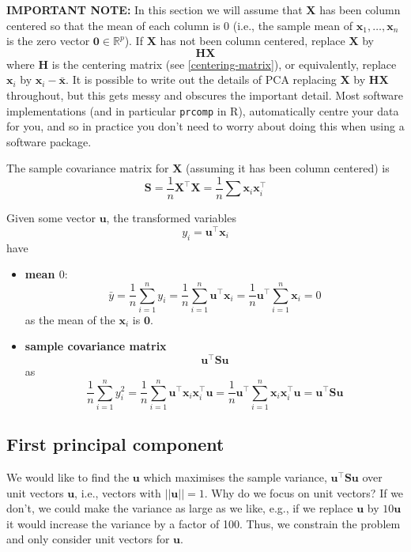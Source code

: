 \documentclass[]{book}
\theoremstyle{definition}
\theoremstyle{definition}
\theoremstyle{definition}
\theoremstyle{remark}
\begin{document}
\textbf{IMPORTANT NOTE:}
In this section we will assume that \(\mathbf X\) has been column centered so that the mean of each column is \(0\) (i.e., the sample mean of \(\mathbf x_1,\ldots,\mathbf x_n\) is the zero vector \(\boldsymbol 0\in \mathbb{R}^p\)). If \(\mathbf X\) has not been column centered, replace \(\mathbf X\) by
\[\mathbf H\mathbf X\] where \(\mathbf H\) is the centering matrix (see \ref{centering-matrix}), or equivalently, replace \(\mathbf x_i\) by \(\mathbf x_i - \bar{\mathbf x}\). It is possible to write out the details of PCA replacing \(\mathbf X\) by \(\mathbf H\mathbf X\) throughout, but this gets messy and obscures the important detail. Most software implementations (and in particular \texttt{prcomp} in R), automatically centre your data for you, and so in practice you don't need to worry about doing this when using a software package.

The sample covariance matrix for \(\mathbf X\) (assuming it has been column centered) is
\[\mathbf S= \frac{1}{n}\mathbf X^\top \mathbf X= \frac{1}{n}\sum \mathbf x_i\mathbf x_i^\top\]

Given some vector \(\mathbf u\), the transformed variables
\[y_i = \mathbf u^\top \mathbf x_i\]
have

\begin{itemize}
\item
  \textbf{mean \(0\)}:
  \[\bar{y}= \frac{1}{n}\sum_{i=1}^n y_i = \frac{1}{n}\sum_{i=1}^n \mathbf u^\top \mathbf x_i =\frac{1}{n} \mathbf u^\top \sum_{i=1}^n  \mathbf x_i = 0\]
  as the mean of the \(\mathbf x_i\) is \(\boldsymbol 0\).
\item
  \textbf{sample covariance matrix} \[\mathbf u^\top \mathbf S\mathbf u\]
  as
  \[\frac{1}{n} \sum_{i=1}^n y_i^2 = \frac{1}{n} \sum_{i=1}^n \mathbf u^\top \mathbf x_i \mathbf x_i^\top\mathbf u= \frac{1}{n}\mathbf u^\top \sum_{i=1}^n  \mathbf x_i \mathbf x_i^\top \mathbf u= \mathbf u^\top \mathbf S\mathbf u
  \]
\end{itemize}

\hypertarget{first-principal-component}{%
\subsection{First principal component}\label{first-principal-component}}

We would like to find the \(\mathbf u\) which maximises the sample variance, \(\mathbf u^\top \mathbf S\mathbf u\) over unit vectors \(\mathbf u\), i.e., vectors with \(||\mathbf u||=1\). Why do we focus on unit vectors? If we don't, we could make the variance as large as we like, e.g., if we replace \(\mathbf u\) by \(10\mathbf u\) it would increase the variance by a factor of 100. Thus, we constrain the problem and only consider unit vectors for \(\mathbf u\).
\end{document}
